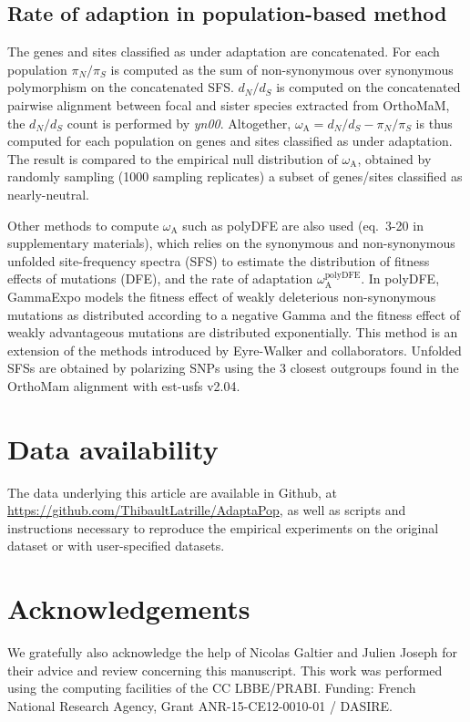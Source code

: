 \documentclass{article}
\newcommand{\dn}{d_N}
\newcommand{\ds}{d_S}
\newcommand{\dnds}{\dn / \ds}
\newcommand{\rateApop}{\omega_{\mathrm{A}}}
\newcommand{\pn}{\pi_N}
\newcommand{\ps}{\pi_S}
\newcommand{\pnps}{\pn / \ps}
\begin{document}
    \subsection*{Rate of adaption in population-based method}

    The genes and sites classified as under adaptation are concatenated.
    For each population $\pnps$ is computed as the sum of non-synonymous over synonymous polymorphism on the concatenated SFS\@.
    $\dnds$ is computed on the concatenated pairwise alignment between focal and sister species extracted from OrthoMaM, the $\dnds$ count is performed by \textit{yn00}.
    Altogether, $\rateApop = \dnds - \pnps$ is thus computed for each population on genes and sites classified as under adaptation.
    The result is compared to the empirical null distribution of $\rateApop$, obtained by randomly sampling (1000 sampling replicates) a subset of genes/sites classified as nearly-neutral.

    Other methods to compute $\rateApop$ such as polyDFE\cite{tataru_polydfe_2020} are also used (eq.~3-20 in supplementary materials), which relies on the synonymous and non-synonymous unfolded site-frequency spectra (SFS) to estimate the distribution of fitness effects of mutations (DFE), and the rate of adaptation $\rateApop^{\mathrm{polyDFE}}$.
    In polyDFE, GammaExpo models the fitness effect of weakly deleterious non-synonymous mutations as distributed according to a negative Gamma and the fitness effect of weakly advantageous mutations are distributed exponentially.
    This method is an extension of the methods introduced by Eyre-Walker and collaborators\cite{eyre-walker_distribution_2006, eyre-walker_estimating_2009}.
    Unfolded SFSs are obtained by polarizing SNPs using the $3$ closest outgroups found in the OrthoMam alignment with est-usfs v2.04\cite{keightley_inferring_2018}.


    \section{Data availability}\label{sec:data-availability}
    The data underlying this article are available in Github, at \url{https://github.com/ThibaultLatrille/AdaptaPop}, as well as scripts and instructions necessary to reproduce the empirical experiments on the original dataset or with user-specified datasets.


    \section{Acknowledgements}\label{sec:acknowledgements}
    We gratefully also acknowledge the help of Nicolas Galtier and Julien Joseph for their advice and review concerning this manuscript.
    This work was performed using the computing facilities of the CC LBBE/PRABI.
    Funding: French National Research Agency, Grant ANR-15-CE12-0010-01 / DASIRE.
\end{document}
